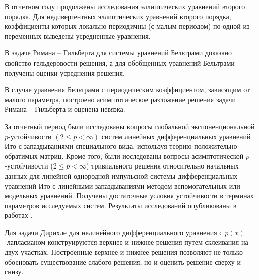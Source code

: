 
В отчетном году продолжены исследования эллиптических уравнений второго порядка. Для недивергентных эллиптических уравнений второго порядка, коэффициенты которых локально периодичны (с малым периодом) по одной из переменных выведены усредненные уравнения.

В задаче Римана -- Гильберта для системы уравнений Бельтрами доказано свойство гельдеровости решения, а для обобщенных уравнений Бельтрами получены оценки усреднения решения.

В случае уравнения Бельтрами с периодическим коэффициентом, зависящим от малого параметра, построено асимптотическое разложение решения задачи Римана – Гильберта и оценена невязка.


За отчетный период были исследованы вопросы глобальной экспоненциональной $p$-устой\-чи\-вос\-ти $(2 \le p < \infty)$ систем линейных дифференциальных уравнений Ито с запаздываниями
специального вида, используя теорию положительно обратимых матриц.
Кроме того, были исследованы вопросы асимптотической
$p$-устойчивости ($2 \le p < \infty $) тривиального решения
относительно начальных данных для линейной однородной импульсной
системы дифференциальных уравнений Ито с линейными запаздываниями
методом вспомогательных или модельных уравнений. Получены достаточные условия устойчивости в терминах параметров исследуемых систем. Результаты исследований опубликованы в работах \cite{kad11,kad12,kad13,kad14}.

Для задачи Дирихле для нелинейного дифференциального уравнения с $p(x)$-лапласиа\-ном конструируются верхнее и нижнее решения путем склеивания на двух участках.
Построенные верхнее и нижнее решения позволяют не только обосновать существование слабого решения, но и оценить решение сверху и  снизу.

